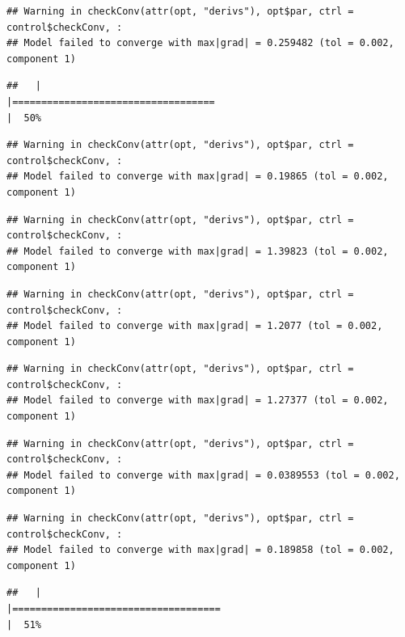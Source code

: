 \documentclass[
  12pt,
]{book}
\begin{document}
\begin{verbatim}
## Warning in checkConv(attr(opt, "derivs"), opt$par, ctrl = control$checkConv, :
## Model failed to converge with max|grad| = 0.259482 (tol = 0.002, component 1)
\end{verbatim}

\begin{verbatim}
##   |                                                                              |===================================                                   |  50%
\end{verbatim}

\begin{verbatim}
## Warning in checkConv(attr(opt, "derivs"), opt$par, ctrl = control$checkConv, :
## Model failed to converge with max|grad| = 0.19865 (tol = 0.002, component 1)
\end{verbatim}

\begin{verbatim}
## Warning in checkConv(attr(opt, "derivs"), opt$par, ctrl = control$checkConv, :
## Model failed to converge with max|grad| = 1.39823 (tol = 0.002, component 1)
\end{verbatim}

\begin{verbatim}
## Warning in checkConv(attr(opt, "derivs"), opt$par, ctrl = control$checkConv, :
## Model failed to converge with max|grad| = 1.2077 (tol = 0.002, component 1)
\end{verbatim}

\begin{verbatim}
## Warning in checkConv(attr(opt, "derivs"), opt$par, ctrl = control$checkConv, :
## Model failed to converge with max|grad| = 1.27377 (tol = 0.002, component 1)
\end{verbatim}

\begin{verbatim}
## Warning in checkConv(attr(opt, "derivs"), opt$par, ctrl = control$checkConv, :
## Model failed to converge with max|grad| = 0.0389553 (tol = 0.002, component 1)
\end{verbatim}

\begin{verbatim}
## Warning in checkConv(attr(opt, "derivs"), opt$par, ctrl = control$checkConv, :
## Model failed to converge with max|grad| = 0.189858 (tol = 0.002, component 1)
\end{verbatim}

\begin{verbatim}
##   |                                                                              |====================================                                  |  51%
\end{verbatim}
\end{document}
